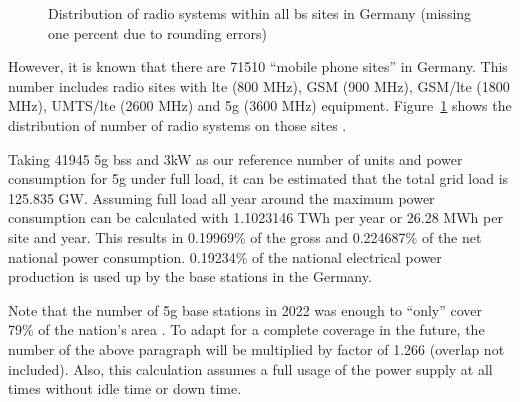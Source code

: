\documentclass[11pt,a4paper]{article}
\begin{document}
\begin{figure}[h]
  \centering
  \caption{Distribution of radio systems within all \acrlong*{bs} sites in Germany \citep{EMF} (missing one percent due to rounding errors)}
  \label{fig:EMFdistribution}
\end{figure}

However, it is known that there are 71510 \enquote{mobile phone sites} in Germany.
This number includes radio sites with \acrshort{lte} (800 MHz), GSM (900 MHz), GSM/\acrshort{lte} (1800 MHz), UMTS/\acrshort{lte} (2600 MHz) and \acrshort{5g} (3600 MHz) equipment.
Figure~\ref{fig:EMFdistribution} shows the distribution of number of radio systems on those sites \citep{EMF}.

Taking 41945 \acrshort{5g} \acrlong{bs}s and 3kW as our reference number of units and power consumption for \acrshort{5g} under full load, it can be estimated that the total grid load is 125.835 GW.
Assuming full load all year around the maximum power consumption can be calculated with 1.1023146 TWh per year or 26.28 MWh per site and year.
This results in 0.19969\% of the gross and 0.224687\% of the net national power consumption.
0.19234\% of the national electrical power production is used up by the base stations in the Germany.

Note that the number of \acrshort{5g} base stations in 2022 was enough to \enquote{only} cover 79\% of the nation's area \citep{5Gausbau}.
To adapt for a complete coverage in the future, the number of the above paragraph will be multiplied by factor of 1.266 (overlap not included).
Also, this calculation assumes a full usage of the power supply at all times without idle time or down time.
\end{document}
